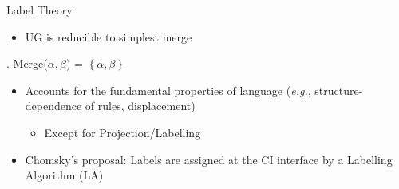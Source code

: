 \documentclass[Proposal]{subfiles}
\begin{document}
\begin{frame}
  {Label Theory}
  {\textcite{chomsky2013problems,chomsky2015problems}}
  \begin{itemize}
    \item UG is reducible to simplest merge
  \end{itemize}
  \ex. Merge($\alpha,\beta$) = $\left\{ \alpha,\beta \right\}$

  \pause
  \begin{itemize}
    \pause
    \item Accounts for the fundamental properties of language (\textit{e.g.}, structure-dependence of rules, displacement)
      \pause
      \begin{itemize}
	\item Except for Projection/Labelling
      \end{itemize}
    \pause
    \item Chomsky's proposal: Labels are assigned at the CI interface by a Labelling Algorithm (LA)
  \end{itemize}
\end{frame}
\end{document}
